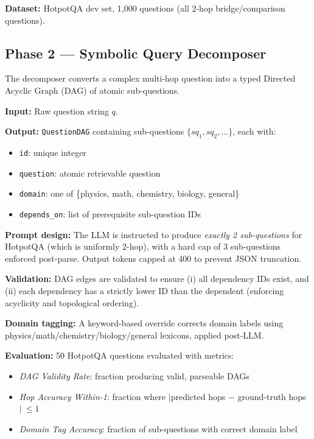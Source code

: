 \documentclass[conference]{IEEEtran}
\begin{document}
\textbf{Dataset:} HotpotQA dev set, 1,000 questions (all 2-hop bridge/comparison questions).

\subsection{Phase 2 — Symbolic Query Decomposer}
\label{sec:phase2}

The decomposer converts a complex multi-hop question into a typed Directed Acyclic Graph (DAG) of atomic sub-questions.

\textbf{Input:} Raw question string $q$.

\textbf{Output:} \texttt{QuestionDAG} containing sub-questions $\{sq_1, sq_2, \ldots\}$, each with:
\begin{itemize}
    \item \texttt{id}: unique integer
    \item \texttt{question}: atomic retrievable question
    \item \texttt{domain}: one of \{physics, math, chemistry, biology, general\}
    \item \texttt{depends\_on}: list of prerequisite sub-question IDs
\end{itemize}

\textbf{Prompt design:} The LLM is instructed to produce \textit{exactly 2 sub-questions} for HotpotQA (which is uniformly 2-hop), with a hard cap of 3 sub-questions enforced post-parse. Output tokens capped at 400 to prevent JSON truncation.

\textbf{Validation:} DAG edges are validated to ensure (i) all dependency IDs exist, and (ii) each dependency has a strictly lower ID than the dependent (enforcing acyclicity and topological ordering).

\textbf{Domain tagging:} A keyword-based override corrects domain labels using physics/math/chemistry/biology/general lexicons, applied post-LLM.

\textbf{Evaluation:} 50 HotpotQA questions evaluated with metrics:
\begin{itemize}
    \item \textit{DAG Validity Rate}: fraction producing valid, parseable DAGs
    \item \textit{Hop Accuracy Within-1}: fraction where $|$predicted hops $-$ ground-truth hops$|\ \leq 1$
    \item \textit{Domain Tag Accuracy}: fraction of sub-questions with correct domain label
\end{itemize}
\end{document}
